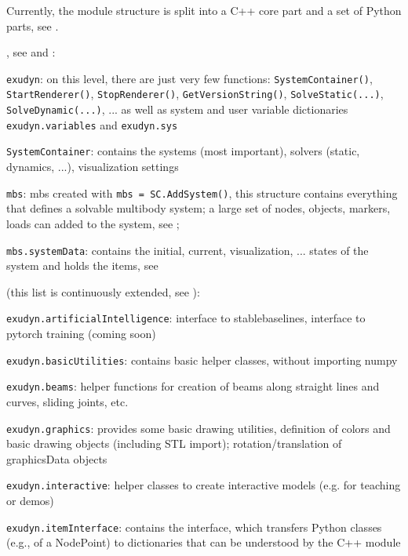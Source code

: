 Currently, the \codeName module structure is split into a C++ core part and a set of 
Python parts, see .
\bi
  \item {}, see  and :
  \bi
    \item[--] \texttt{exudyn}:
    on this level, there are just very few functions: \texttt{SystemContainer()}, \texttt{StartRenderer()}, \texttt{StopRenderer()}, \texttt{GetVersionString()}, \texttt{SolveStatic(...)}, \texttt{SolveDynamic(...)}, ... as well as system and user variable dictionaries \texttt{exudyn.variables} and \texttt{exudyn.sys}
    \item[--] \texttt{SystemContainer}: contains the systems (most important), solvers (static, dynamics, ...), visualization settings
    \item[--] \texttt{mbs}: \acf{mbs} created with \texttt{mbs = SC.AddSystem()}, this structure contains everything that defines a solvable multibody system; a large set of nodes, objects, markers, 
    loads can added to the system, see ;
    \item[--] \texttt{mbs.systemData}: contains the initial, current, visualization, ... states of the system and holds the items, see 
  \ei
  \item {} (this list is continuously extended, see ):
  \bi
    \item[--] \texttt{exudyn.artificialIntelligence}: interface to stablebaselines, interface to pytorch training (coming soon)
    \item[--] \texttt{exudyn.basicUtilities}: contains basic helper classes, without importing numpy
    \item[--] \texttt{exudyn.beams}: helper functions for creation of beams along straight lines and curves, sliding joints, etc.
    \item[--] \texttt{exudyn.graphics}: provides some basic drawing utilities, definition of colors and basic drawing objects (including \acs{STL} import); rotation/translation of graphicsData objects
    \item[--] \texttt{exudyn.interactive}: helper classes to create interactive models (e.g. for teaching or demos)
    \item[--] \texttt{exudyn.itemInterface}: contains the interface, which transfers Python classes (e.g., of a NodePoint) to dictionaries that can be understood by the C++ module
